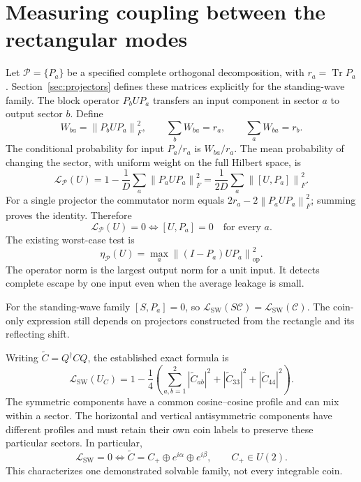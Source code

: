 \documentclass[11pt,a4paper,oneside]{report}
\newcommand{\CC}{\mathcal C}
\newcommand{\Id}{I}
\newcommand{\Tr}{\operatorname{Tr}}
\newcommand{\norm}[1]{\left\lVert#1\right\rVert}
\newcommand{\sw}{\mathrm{SW}}
\numberwithin{equation}{chapter}
\begin{document}
\section{Measuring coupling between the rectangular modes}
\label{sec:modeleakage}

Let \(\mathscr P=\{P_a\}\) be a specified complete orthogonal
decomposition, with \(r_a=\Tr P_a\). Section~\ref{sec:projectors}
defines these matrices explicitly for the standing-wave family.
The block operator \(P_bUP_a\) transfers an input component in
sector \(a\) to output sector \(b\). Define
\begin{equation}
W_{ba}=\norm{P_bUP_a}_F^2,\qquad
\sum_bW_{ba}=r_a,\qquad\sum_aW_{ba}=r_b.
\end{equation}
The conditional probability for input \(P_a/r_a\) is \(W_{ba}/r_a\).
The mean probability of changing the sector, with uniform weight on
the full Hilbert space, is
\begin{equation}
\boxed{
\mathcal L_{\mathscr P}(U)
=1-\frac1D\sum_a\norm{P_aUP_a}_F^2
=\frac1{2D}\sum_a\norm{[U,P_a]}_F^2.
}
\label{eq:leakage}
\end{equation}
For a single projector the commutator norm equals
\(2r_a-2\norm{P_aUP_a}_F^2\); summing proves the identity. Therefore
\begin{equation}
\boxed{\mathcal L_{\mathscr P}(U)=0
\iff[U,P_a]=0\quad\text{for every }a.}
\end{equation}
The existing worst-case test is
\[
\eta_{\mathscr P}(U)=\max_a\norm{(\Id-P_a)UP_a}_{\mathrm{op}}^2.
\]
The operator norm is the largest output norm for a unit input.
It detects complete escape by one input even when the average
leakage is small.

For the standing-wave family \([S,P_a]=0\), so
\(\mathcal L_{\sw}(S\CC)=\mathcal L_{\sw}(\CC)\).
The coin-only expression still depends on projectors constructed from
the rectangle and its reflecting shift.

Writing \(\widetilde C=Q^\dagger CQ\), the established exact formula is
\begin{equation}
\boxed{
\mathcal L_{\sw}(U_C)=1-\frac14\left(
\sum_{a,b=1}^2|\widetilde C_{ab}|^2
+|\widetilde C_{33}|^2+|\widetilde C_{44}|^2\right).
}
\label{eq:closedleak}
\end{equation}
The symmetric components have a common cosine--cosine profile and can
mix within a sector. The horizontal and vertical antisymmetric
components have different profiles and must retain their own coin
labels to preserve these particular sectors. In particular,
\begin{equation}
\mathcal L_{\sw}=0
\iff\widetilde C=C_+\oplus e^{i\alpha}\oplus e^{i\beta},
\qquad C_+\in U(2).
\label{eq:SWfamily}
\end{equation}
This characterizes one demonstrated solvable family, not every
integrable coin.
\end{document}
